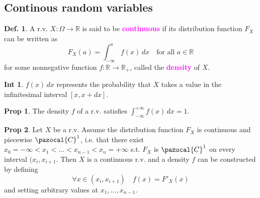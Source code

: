 \documentclass[8pt,a4paper,landscape]{article}
\theoremstyle{definition}
\newtheorem{definition}{Def.}[section]
\theoremstyle{example}
\theoremstyle{intuition}
\newtheorem*{intuition}{Int}
\theoremstyle{definition}
\newtheorem{proposition}{Prop}[section]
\newcommand{\Cb}{\pazocal{C}}
\newcommand{\mydef}[1]{\textcolor{magenta}{\textbf{#1}}}
\begin{document}
\begin{multicols}{3}
		\subsection{Continous random variables}
			
			\begin{definition}
				A r.v. $X : \Omega \to \mathbb{R}$ is said to be \mydef{continuous} if its distribution function $F_X$ can be written as
				$$
				F_X(a) = \int_{-\infty}^{a} f(x)\, dx \quad \text{for all } a \in \mathbb{R}
				$$
				for some nonnegative function $f : \mathbb{R} \to \mathbb{R_+}$, called the \mydef{density} of $X$.
			\end{definition}

			\begin{intuition}
				$f(x)\, dx$ represents the probability that $X$ takes a value in the infinitesimal interval $\left[x, x + dx\right]$.
			\end{intuition}

			\begin{proposition}
				The density $f$ of a r.v. satisfies $\int_{-\infty}^{+\infty} f(x)\, dx = 1$.
			\end{proposition}

			\begin{proposition}
				Let $X$ be a r.v. Assume the distribution function $F_X$ is continuous and piecewise $\Cb^1$, i.e. that there exist $x_0 = -\infty < x_1 < \ldots < x_{n-1} < x_n = +\infty$ s.t. $F_X$ is $\Cb^1$ on every interval $(x_i, x_{i+1}$. Then $X$ is a continuous r.v. and a density $f$ can be constructed by defining 
				$$
					\forall x \in (x_i, x_{i+1}) \quad f(x) = F'_X(x)
				$$
				and setting arbitrary values at $x_1, \ldots, x_{n-1}$.
			\end{proposition}



	
\end{multicols}	
\end{document}
